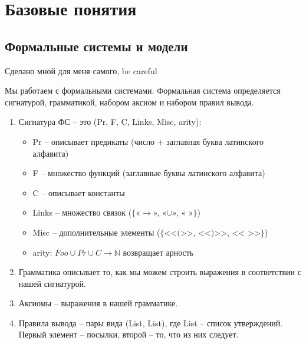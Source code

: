 \section{Базовые понятия}
\label{sec-1}
\subsection{Формальные системы и модели}
\label{sec-1-1}
Сделано мной для меня самого, be careful

Мы работаем с формальными системами.
Формальная система определяется сигнатурой, грамматикой,
набором аксиом и набором правил вывода.
\begin{enumerate}
\item Сигнатура ФС -- это (Pr, F, C, Links, Misc, arity):
\begin{itemize}
\item Pr -- описывает предикаты (число + заглавная буква латинского алфавита)
\item F -- множество функций (заглавные буквы латинского алфавита)
\item C -- описывает константы
\item Links -- множество связок ($\lbrace$«$\to$», «$\cup$», « »$\rbrace$)
\item Misc -- дополнительные элементы ($\lbrace$<<$($>>, <<$)$>>, << >>$\rbrace$)
\item arity: $Foo \cup Pr \cup C \to \mathbb N$ возвращает арность
\end{itemize}
\item Грамматика описывает то, как мы можем строить выражения
в соответствии с нашей сигнатурой.
\item Аксиомы -- выражения в нашей грамматике.
\item Правила вывода -- пары вида (List, List), где List --
список утверждений. Первый элемент – посылки, второй --
то, что из них следует.
\end{enumerate}


